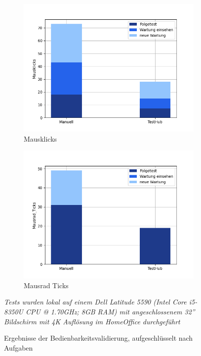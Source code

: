 \begin{figure}[H]
\begin{subfigure}{.5\textwidth}
        \includegraphics[width=\linewidth]{speedtests/validierung_Mausklicks.png}
        \caption{Mausklicks}
      \end{subfigure}%
      \begin{subfigure}{.5\textwidth}
        \centering
        \includegraphics[width=\linewidth]{speedtests/validierung_Mausrad_Ticks.png}
        \caption{Mausrad Ticks}
      \end{subfigure}
    \caption{Ergebnisse der Bedienbarkeitsvalidierung, aufgeschlüsselt nach Aufgaben}
    \textit{Tests wurden lokal auf einem Dell Latitude 5590 (Intel Core i5-8350U CPU
    @ 1.70GHz; 8GB RAM) mit angeschlossenem 32'' Bildschirm mit 4K Auflösung im HomeOffice durchgeführt}
\end{figure}


